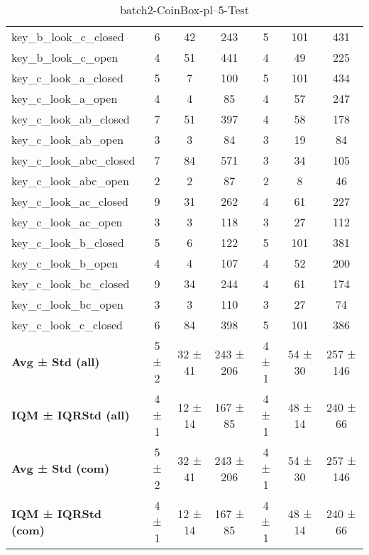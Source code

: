 \begin{table}[!ht]
\begin{tabular}{l|ccc|ccc}
key\_b\_look\_c\_closed & 6 & 42 & 243 & 5 & 101 & 431 \\
key\_b\_look\_c\_open & 4 & 51 & 441 & 4 & 49 & 225 \\
key\_c\_look\_a\_closed & 5 & 7 & 100 & 5 & 101 & 434 \\
key\_c\_look\_a\_open & 4 & 4 & 85 & 4 & 57 & 247 \\
key\_c\_look\_ab\_closed & 7 & 51 & 397 & 4 & 58 & 178 \\
key\_c\_look\_ab\_open & 3 & 3 & 84 & 3 & 19 & 84 \\
key\_c\_look\_abc\_closed & 7 & 84 & 571 & 3 & 34 & 105 \\
key\_c\_look\_abc\_open & 2 & 2 & 87 & 2 & 8 & 46 \\
key\_c\_look\_ac\_closed & 9 & 31 & 262 & 4 & 61 & 227 \\
key\_c\_look\_ac\_open & 3 & 3 & 118 & 3 & 27 & 112 \\
key\_c\_look\_b\_closed & 5 & 6 & 122 & 5 & 101 & 381 \\
key\_c\_look\_b\_open & 4 & 4 & 107 & 4 & 52 & 200 \\
key\_c\_look\_bc\_closed & 9 & 34 & 244 & 4 & 61 & 174 \\
key\_c\_look\_bc\_open & 3 & 3 & 110 & 3 & 27 & 74 \\
key\_c\_look\_c\_closed & 6 & 84 & 398 & 5 & 101 & 386 \\
\hline
\textbf{Avg ± Std (all)} & 5 ± 2 & 32 ± 41 & 243 ± 206 & 4 ± 1 & 54 ± 30 & 257 ± 146 \\
\textbf{IQM ± IQRStd (all)} & 4 ± 1 & 12 ± 14 & 167 ± 85 & 4 ± 1 & 48 ± 14 & 240 ± 66 \\
\textbf{Avg ± Std (com)} & 5 ± 2 & 32 ± 41 & 243 ± 206 & 4 ± 1 & 54 ± 30 & 257 ± 146 \\
\textbf{IQM ± IQRStd (com)} & 4 ± 1 & 12 ± 14 & 167 ± 85 & 4 ± 1 & 48 ± 14 & 240 ± 66 \\
\end{tabular}
\caption{batch2-CoinBox-pl--5-Test}
\label{tab:batch2_CoinBox_pl__5_comparison_test}
\end{table}

